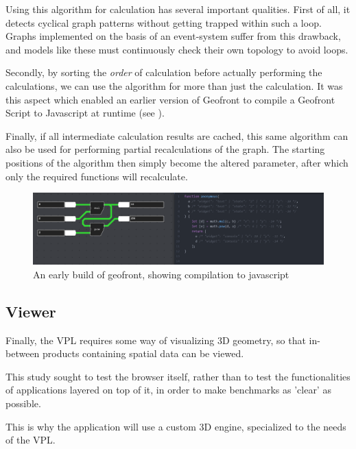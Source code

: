 Using this algorithm for calculation has several important qualities. 
First of all, it detects cyclical graph patterns without getting trapped within such a loop. 
Graphs implemented on the basis of an event-system suffer from this drawback, and models like these must continuously check their own topology to avoid loops. 

Secondly, by sorting the \emph{order} of calculation before actually performing the calculations, we can use the algorithm for more than just the calculation.
It was this aspect which enabled an earlier version of Geofront to compile a Geofront Script to Javascript at runtime (see ).

Finally, if all intermediate calculation results are cached, this same algorithm can also be used for performing partial recalculations of the graph. 
The starting positions of the algorithm then simply become the altered parameter, after which only the required functions will recalculate. 

\begin{figure}
  \centering
  \graphicspath{ {../../assets/images/implementation/} }
  \includegraphics[width=\linewidth]{early-geofront.png}
  \caption[Geofront to js]{An early build of geofront, showing compilation to javascript}
  \label{fig:early-geofront-compile-to-js}
\end{figure}

\subsection*{Viewer}

Finally, the VPL requires some way of visualizing 3D geometry, so that in-between products containing spatial data can be viewed. 

This study sought to test the browser itself, rather than to test the functionalities of applications layered on top of it, in order to make benchmarks as 'clear' as possible. 

This is why the application will use a custom 3D engine, specialized to the needs of the VPL. 



